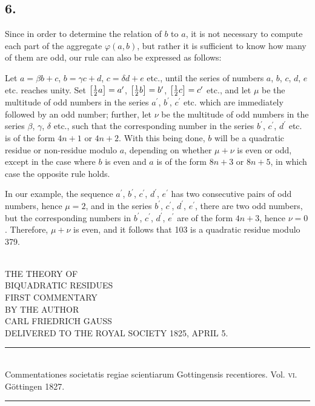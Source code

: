 \documentclass[twoside,12pt]{memoir}
\let\oldfrac\frac
\def\frac#1#2{\mathchoice{\tfrac{#1}{#2}}{\oldfrac{#1}{#2}}{\genfrac{}{}{}{2}{#1}{#2\mathstrut}}{\genfrac{}{}{}{3}{#1}{#2\mathstrut}}}
\begin{document}
\subsection*{6.}

Since in order to determine the relation of \(b\) to \(a\), it is not necessary to compute each part of the aggregate \(\varphi(a, b)\), but rather it is sufficient to know how many of them are odd, our rule can also be expressed as follows:

Let \(a = \beta b+c\), \(b = \gamma c+d\), \(c = \delta d+e\) etc{.}, until the series of numbers \(a\), \(b\), \(c\), \(d\), \(e\) etc{.} reaches unity.  Set \(\left[\frac{1}{2} a\right]=a^{\prime}\), \(\left[\frac{1}{2} b\right]=b^{\prime}\), \(\left[\frac{1}{2} c\right]=c^{\prime}\) etc{.}, and let \(\mu\) be the multitude of odd numbers in the series \(a^{\prime}\), \(b^{\prime}\), \(c^{\prime}\) etc{.} which are immediately followed by an odd number; further, let \(\nu\) be the multitude of odd numbers in the series \(\beta\), \(\gamma\), \(\delta\) etc{.}, such that the corresponding number in the series \(b^{\prime}\), \(c^{\prime}\), \(d^{\prime}\) etc{.} is of the form \(4n+1\) or \(4n+2\). With this being done, \(b\) will be a quadratic residue or non-residue modulo \(a\), depending on whether \(\mu + \nu\) is even or odd, except in the case where \(b\) is even and \(a\) is of the form \(8n+3\) or \(8n+5\), in which case the opposite rule holds.

In our example, the sequence \(a^{\prime}\), \(b^{\prime}\), \(c^{\prime}\), \(d^{\prime}\), \(e^{\prime}\) has two consecutive pairs of odd numbers, hence \(\mu =2\), and in the series \(b^{\prime}\), \(c^{\prime}\), \(d^{\prime}\), \(e^{\prime}\), there are two odd numbers, but the corresponding numbers in \(b^{\prime}\), \(c^{\prime}\), \(d^{\prime}\), \(e^{\prime}\) are of the form \(4n+3\), hence \(\nu = 0\). Therefore, \(\mu + \nu\) is even, and it follows that 103 is a quadratic residue modulo 379.
%
\clearpage\noindent

\begin{center}
\;\\[4\baselineskip]
{\large THE THEORY OF }\\[\baselineskip]
{\LARGE BIQUADRATIC RESIDUES }\\[3\baselineskip]
{\large FIRST COMMENTARY}\\[2.5\baselineskip]
{\tiny BY THE AUTHOR}\\[1.5\baselineskip]
CARL FRIEDRICH GAUSS\\[1.5\baselineskip]
{\scriptsize DELIVERED TO THE ROYAL SOCIETY {\tiny \textsc{1825},} APRIL {\tiny \textsc{5}.}}\\[4\baselineskip]
\rule{4in}{0.5pt}\\[0.5\baselineskip]
{\small Commentationes societatis regiae scientiarum Gottingensis recentiores. Vol. \textsc{vi}.\\
Göttingen \textsc{1827}.}\\
\rule{4in}{0.5pt}
\end{center}
\clearpage\noindent
\end{document}
